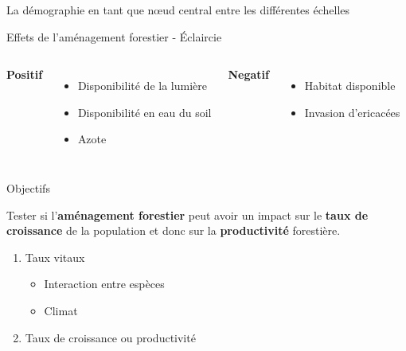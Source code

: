 \documentclass[11pt, compress, aspectratio=1610]{beamer}
\providecommand{\tightlist}{%
  \setlength{\itemsep}{0pt}\setlength{\parskip}{0pt}}
\newcommand{\begincols}{\begin{columns}}
\newcommand{\stopcols}{\end{columns}}
\begin{document}
\begin{frame}{La démographie en tant que nœud central entre les
différentes échelles}

\begin{frame}{Effets de l’aménagement forestier - Éclaircie}
\protect\hypertarget{effets-de-lamuxe9nagement-forestier---uxe9claircie}{}

\begincols
\hspace*{20mm}

\textbf{Positif}

\begin{itemize}
    \item
      Disponibilité de la lumière
    \item
      Disponibilité en eau du soil
    \item
      Azote
  \end{itemize}
\hfill{}
  \vspace*{-15mm}

\textbf{Negatif}

\begin{itemize}
    \item
      Habitat disponible
    \item
      Invasion d'ericacées
  \end{itemize}
\stopcols

\end{frame}

\begin{frame}{Objectifs}
\protect\hypertarget{objectifs-3}{}

\centering

Tester si l’\textbf{aménagement forestier} peut avoir un impact sur le
\textbf{taux de croissance} de la population et donc sur la
\textbf{productivité} forestière.

\begin{enumerate}
[1.]
\tightlist
\item
  Taux vitaux

  \begin{itemize}
  \tightlist
  \item
    Interaction entre espèces
  \item
    Climat
  \end{itemize}
\item
  Taux de croissance ou productivité
\end{enumerate}


\end{frame}
\end{frame}
\end{document}
